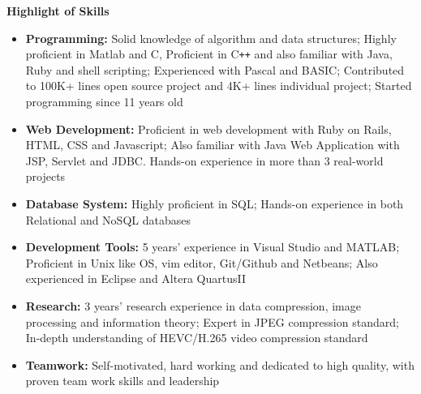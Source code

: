 \documentclass[letterpaper,10pt]{article}
\newcommand{\resheading}[1]{{\large \colorbox{mygrey}{\begin{minipage}{\textwidth}{\textbf{#1 \vphantom{p\^{E}}}}\end{minipage}}}}
\begin{document}
\resheading{Highlight of Skills}
\begin{itemize}
\itemsep0em
\item {\textbf {Programming:}} Solid knowledge of algorithm and data structures; Highly proficient in Matlab and C, Proficient in C{}\verb!++! and also familiar with Java, Ruby and shell scripting; Experienced with Pascal and BASIC; Contributed to 100K+ lines open source project and 4K+ lines individual project; Started programming since 11 years old
\item{\textbf {Web Development:}} Proficient in web development with Ruby on Rails, HTML, CSS and Javascript; Also familiar with Java Web Application with JSP, Servlet and JDBC. Hands-on experience in more than 3 real-world projects
\item{\textbf {Database System:}} Highly proficient in SQL; Hands-on experience in both Relational and NoSQL databases
\item{\textbf {Development Tools:}} 5 years' experience in Visual Studio and MATLAB; Proficient in Unix like OS, vim editor, Git/Github and Netbeans; Also experienced in Eclipse and Altera QuartusII
\item{\textbf {Research:}} 3 years' research experience in data compression, image processing and information theory; Expert in JPEG compression standard; In-depth understanding of HEVC/H.265 video compression standard
\item{\textbf {Teamwork:}} Self-motivated, hard working and dedicated to high quality, with proven team work skills and leadership

\end{itemize}
\end{document}
